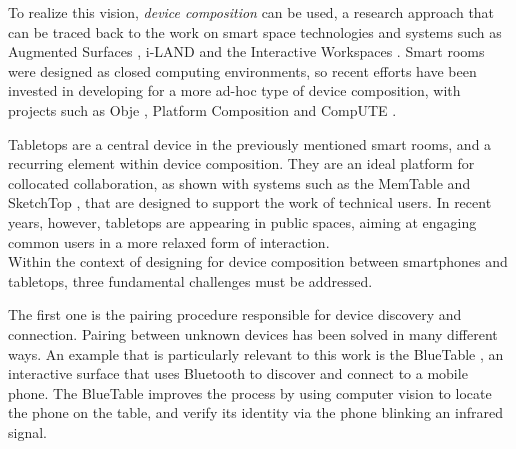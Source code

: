 To realize this vision, \emph{device composition} can be used, a research approach that can be traced back to the work on smart space technologies and systems such as Augmented Surfaces \citep{Rekimoto:1999:augmentedsurfaces}, \mbox{i-LAND} \citep{Streitz:1999:iland} and the Interactive Workspaces \citep{Johanson:2002:iroom}.
Smart rooms were designed as closed computing environments, so recent efforts have been invested in developing for a more ad-hoc type of device composition, with projects such as Obje \citep{Edwards:2009:obje}, Platform Composition \citep{Pering:2009:platformcomp} and CompUTE \citep{Bardram:2010:compute}.

Tabletops are a central device in the previously mentioned smart rooms, and a recurring element within device composition.
They are an ideal platform for collocated collaboration, as shown with systems such as the MemTable \citep{Hunter:2011:memtable} and SketchTop \citep{Clifton:2010:sketchtop}, that are designed to support the work of technical users.
In recent years, however, tabletops are appearing in public spaces, aiming at engaging common users in a more relaxed form of interaction.
\\
\linebreak
Within the context of designing for device composition between smartphones and tabletops, three fundamental challenges must be addressed.

The first one is the pairing procedure responsible for device discovery and connection.
Pairing between unknown devices has been solved in many different ways.
An example that is particularly relevant to this work is the BlueTable \citep{Wilson:2007:bluetable}, an interactive surface that uses Bluetooth to discover and connect to a mobile phone.
The BlueTable improves the process by using computer vision to locate the phone on the table, and verify its identity via the phone blinking an infrared signal.

